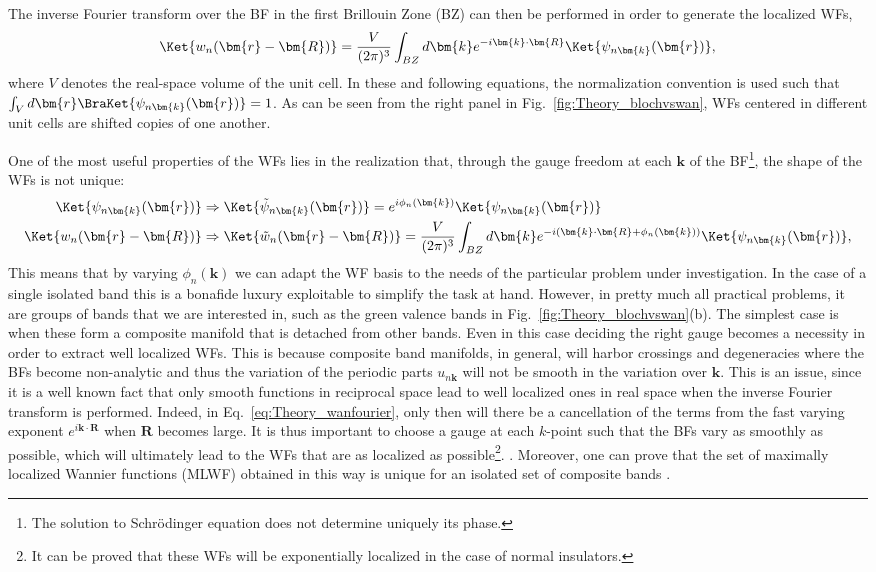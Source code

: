 The inverse Fourier transform over the BF in the first Brillouin Zone (BZ) can then be performed in order to generate the localized WFs,
\begin{equation}
	\label{eq:Theory_wanfourier}
	\Ket{w_{n}(\bm{r} - \bm{R})} = \frac{V}{(2\pi)^3} \int_{BZ} d \bm{k} e^{-i \bm{k} \cdot \bm{R}} \Ket{\psi_{n\bm{k}}(\bm{r})},
\end{equation}
where $V$ denotes the real-space volume of the unit cell.
In these and following equations, the normalization convention is used such that $\int_V d\bm{r}\BraKet{\psi_{n\bm{k}}(\bm{r})} = 1$.
As can be seen from the right panel in Fig.~\ref{fig:Theory_blochvswan}, WFs centered in different unit cells are shifted copies of one another.

One of the most useful properties of the WFs lies in the realization that, through the gauge freedom at each $\bm{k}$ of the BF\footnote{The solution to Schr\"odinger equation does not determine uniquely its phase.}, the shape of the WFs is not unique:
\begin{align}
	\Ket{\psi_{n\bm{k}}(\bm{r})} &\Rightarrow \Ket{\tilde{\psi}_{n\bm{k}}(\bm{r})} = e^{i \phi_n(\bm{k})} \Ket{\psi_{n\bm{k}}(\bm{r})} \\
	\Ket{w_{n}(\bm{r} - \bm{R})} &\Rightarrow \Ket{\tilde{w}_{n}(\bm{r} - \bm{R})} = \frac{V}{(2\pi)^3} \int_{BZ} d \bm{k} e^{-i (\bm{k} \cdot \bm{R} + \phi_n(\bm{k}))} \Ket{\psi_{n\bm{k}}(\bm{r})},
\end{align}
This means that by varying $\phi_n(\bm{k})$ we can adapt the WF basis to the needs of the particular problem under investigation.
In the case of a single isolated band this is a bonafide luxury exploitable to simplify the task at hand.
However, in pretty much all practical problems, it are groups of bands that we are interested in, such as the green valence bands in Fig.~\ref{fig:Theory_blochvswan}(b).
The simplest case is when these form a composite manifold that is detached from other bands.
Even in this case deciding the right gauge becomes a necessity in order to extract well localized WFs.
This is because composite band manifolds, in general, will harbor crossings and degeneracies where the BFs become non-analytic and thus the variation of the periodic parts $u_{n\bm{k}}$ will not be smooth in the variation over $\bm{k}$.
This is an issue, since it is a well known fact that only smooth functions in reciprocal space lead to well localized ones in real space when the inverse Fourier transform is performed.
Indeed, in Eq.~\ref{eq:Theory_wanfourier}, only then will there be a cancellation of the terms from the fast varying exponent $e^{i \bm{k}\cdot \bm{R}}$ when $\bm{R}$ becomes large.
It is thus important to choose a gauge at each $k$-point such that the BFs vary as smoothly as possible, which will ultimately lead to the WFs that are as localized as possible\footnote{It can be proved that these WFs will be exponentially localized in the case of normal insulators.}. .
Moreover, one can prove that the set of maximally localized Wannier functions (MLWF) obtained in this way is unique for an isolated set of composite bands \cite{Kunes2004, Marzari2012}.

